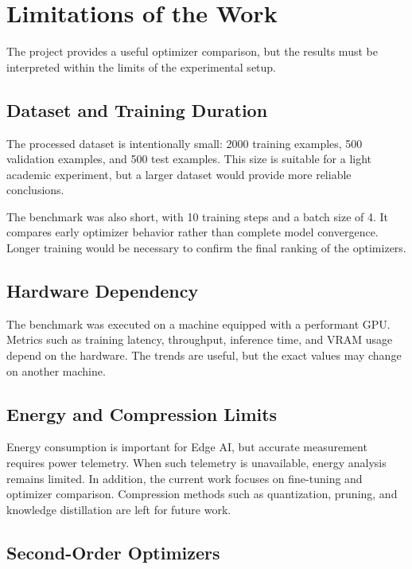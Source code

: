 \chapter{Limitations of the Work}

\vspace*{0.3cm}

The project provides a useful optimizer comparison, but the results must be
interpreted within the limits of the experimental setup.

\section{Dataset and Training Duration}

The processed dataset is intentionally small: 2000 training examples, 500
validation examples, and 500 test examples. This size is suitable for a light
academic experiment, but a larger dataset would provide more reliable conclusions.

\vspace*{0.15cm}

The benchmark was also short, with 10 training steps and a batch size of 4. It
compares early optimizer behavior rather than complete model convergence. Longer
training would be necessary to confirm the final ranking of the optimizers.

\section{Hardware Dependency}

The benchmark was executed on a machine equipped with a performant GPU. Metrics
such as training latency, throughput, inference time, and VRAM usage depend on
the hardware. The trends are useful, but the exact values may change on another
machine.

\section{Energy and Compression Limits}

Energy consumption is important for Edge AI, but accurate measurement requires
power telemetry. When such telemetry is unavailable, energy analysis remains
limited. In addition, the current work focuses on fine-tuning and optimizer
comparison. Compression methods such as quantization, pruning, and knowledge
distillation are left for future work.

\section{Second-Order Optimizers}

